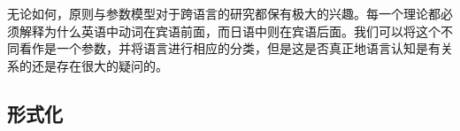 无论如何，原则与参数模型对于跨语言的研究都保有极大的兴趣。每一个理论都必须解释为什么英语中动词在宾语前面，而日语中则在宾语后面。我们可以将这个不同看作是一个参数，并将语言进行相应的分类，但是这是否真正地语言认知是有关系的还是存在很大的疑问的。

\subsection{形式化}
\label{sec-formalization-gb}


